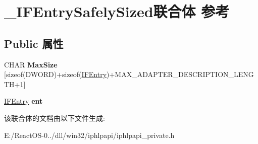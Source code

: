 \hypertarget{union___i_f_entry_safely_sized}{}\section{\+\_\+\+I\+F\+Entry\+Safely\+Sized联合体 参考}
\label{union___i_f_entry_safely_sized}
\subsection*{Public 属性}
\begin{DoxyCompactItemize}
\item 
\mbox{\label{union___i_f_entry_safely_sized_a76d5d21e078e9c1a8edaae4cfadb67e3}} 
C\+H\+AR {\bfseries Max\+Size} \mbox{[}sizeof(D\+W\+O\+RD)+sizeof(\hyperlink{struct_i_f_entry}{I\+F\+Entry})+M\+A\+X\+\_\+\+A\+D\+A\+P\+T\+E\+R\+\_\+\+D\+E\+S\+C\+R\+I\+P\+T\+I\+O\+N\+\_\+\+L\+E\+N\+G\+TH+1\mbox{]}
\item 
\mbox{\label{union___i_f_entry_safely_sized_a86de158cde1e9801b8c03db2a4e7a275}} 
\hyperlink{struct_i_f_entry}{I\+F\+Entry} {\bfseries ent}
\end{DoxyCompactItemize}


该联合体的文档由以下文件生成\+:\begin{DoxyCompactItemize}
\item 
E\+:/\+React\+O\+S-\/0../dll/win32/iphlpapi/iphlpapi\+\_\+private.\+h\end{DoxyCompactItemize}
